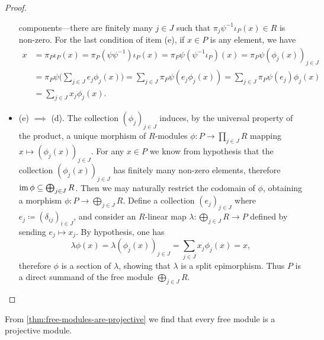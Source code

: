 \begin{proof}
\begin{itemize}
              components---there are finitely many \(j \in J\) such that
              \(\pi_j \psi^{-1} \iota_P(x) \in R\) is non-zero. For the last condition of
              item (e), if \(x \in P\) is any element, we have
              \begin{align*}
                  x & = \pi_P \iota_P(x)
                  = \pi_P(\psi \psi^{-1}) \iota_P(x)
                  = \pi_P \psi (\psi^{-1} \iota_P)(x)
                  = \pi_P \psi (\phi_j(x))_{j \in J}                          \\
                    & = \pi_P \psi \bigg( \sum_{j \in J} e_j \phi_j(x) \bigg)
                  = \sum_{j \in J} \pi_P \psi(e_j \phi_j(x))
                  = \sum_{j \in J} \pi_P \psi(e_j) \phi_j(x)                  \\
                    & = \sum_{j \in J} x_j \phi_j(x).
              \end{align*}

        \item (e) \(\implies\) (d). The collection \((\phi_j)_{j \in J}\) induces, by
              the universal property of the product, a unique morphism of \(R\)-modules
              \(\phi: P \to \prod_{j \in J} R\) mapping \(x \mapsto (\phi_j(x))_{j \in
                  J}\). For any \(x \in P\) we know from hypothesis that the collection
              \((\phi_j(x))_{j \in J}\) has finitely many non-zero elements, therefore
              \(\operatorname{im} \phi \subseteq \bigoplus_{j \in J} R\). Then we may naturally restrict
              the codomain of \(\phi\), obtaining a morphism
              \(\phi: P \to \bigoplus_{j \in J} R\). Define a collection \((e_j)_{j \in J}\)
              where \(e_j \coloneq (\delta_{ij})_{i \in J}\), and consider an \(R\)-linear
              map \(\lambda: \bigoplus_{j \in J} R \to P\) defined by sending
              \(e_j \mapsto x_j\). By hypothesis, one has
              \[
                  \lambda \phi(x)
                  = \lambda(\phi_j(x))_{j \in J}
                  = \sum_{j \in J} x_j \phi_j(x)
                  = x,
              \]
              therefore \(\phi\) is a section of \(\lambda\), showing that \(\lambda\) is a
              split epimorphism. Thus \(P\) is a direct summand of the free module
              \(\bigoplus_{j \in J} R\).
    \end{itemize}
\end{proof}

\begin{example}
    \label{exp:free-mod-is-projective}
    From \cref{thm:free-modules-are-projective} we find that every free module is a
    projective module.
\end{example}

